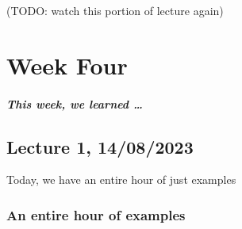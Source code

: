 \documentclass[a4paper]{report}
\theoremstyle{definition}
\theoremstyle{remark}
\theoremstyle{proposition}
\theoremstyle{conjecture}
\theoremstyle{lemma}
\theoremstyle{corollary}
\theoremstyle{exercise}
\theoremstyle{example}
\begin{document}
(TODO: watch this portion of lecture again)

\chapter{Week Four}

\paragraph{This week, we learned \ldots}

\section{Lecture 1, 14/08/2023}

Today, we have an entire hour of just examples

\subsection{An entire hour of examples}
\end{document}
